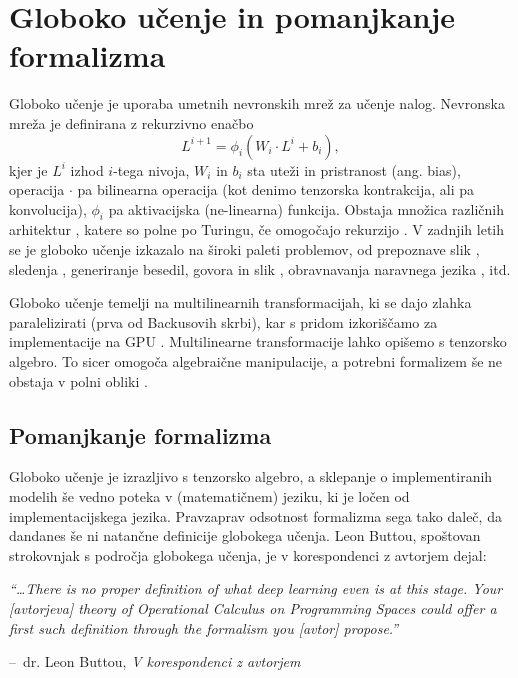 \documentclass[a4paper, 12pt]{book}
\makeatletter
\newenvironment{chapquote}[2][2em]
  {\setlength{\@tempdima}{#1}%
   \def\chapquote@author{#2}%
   \parshape 1 \@tempdima \dimexpr\textwidth-2\@tempdima\relax%
   \itshape}
  {\par\normalfont\hfill--\ \chapquote@author\hspace*{\@tempdima}\par\bigskip}
\makeatother
\begin{document}
\section{Globoko učenje in pomanjkanje formalizma}\label{sec:deepLearning}

Globoko učenje je uporaba umetnih nevronskih mrež za učenje nalog. Nevronska mreža je definirana z rekurzivno enačbo
$$L^{i+1}=\phi_i(W_i\cdot L^i +b_i),$$
kjer je $L^i$ izhod $i$-tega nivoja, $W_i$ in $b_i$ sta uteži in pristranost (ang. bias), operacija $\cdot$ pa bilinearna operacija (kot denimo tenzorska kontrakcija, ali pa konvolucija), $\phi_i$ pa aktivacijska (ne-linearna) funkcija. Obstaja množica različnih arhitektur \cite{ConvNet}\cite{LSTM}\cite{resNet}, katere so polne po Turingu, če omogočajo rekurzijo \cite{DLbook}. V zadnjih letih se je globoko učenje izkazalo na široki paleti problemov, od prepoznave slik \cite{fasterRCNN}, sledenja \cite{trackNet}, generiranje besedil, govora in slik \cite{genText}, obravnavanja naravnega jezika \cite{NLP}, itd.

Globoko učenje temelji na multilinearnih transformacijah, ki se dajo zlahka paralelizirati (prva od Backusovih skrbi), kar s pridom izkoriščamo za implementacije na GPU \cite{TensorGPU}. Multilinearne transformacije lahko opišemo s tenzorsko algebro. To sicer omogoča algebraične manipulacije, a potrebni formalizem še ne obstaja v polni obliki \cite{whyDL}.

\subsection{Pomanjkanje formalizma}

Globoko učenje je izrazljivo s tenzorsko algebro, a sklepanje o implementiranih modelih še vedno poteka v (matematičnem) jeziku, ki je ločen od implementacijskega jezika. Pravzaprav odsotnost formalizma sega tako daleč, da dandanes še ni natančne definicije globokega učenja.
Leon Buttou, spoštovan strokovnjak s področja globokega učenja, je v korespondenci z avtorjem dejal:

\begin{chapquote}{\small{dr. Leon Buttou, \textit{V korespondenci z avtorjem}}}
``\dots There is no proper definition of what deep learning even is at this stage. Your [avtorjeva] theory of Operational Calculus on Programming Spaces \cite{opCalProg} could offer a first such definition through the formalism you [avtor] propose.''
\end{chapquote}
\end{document}
